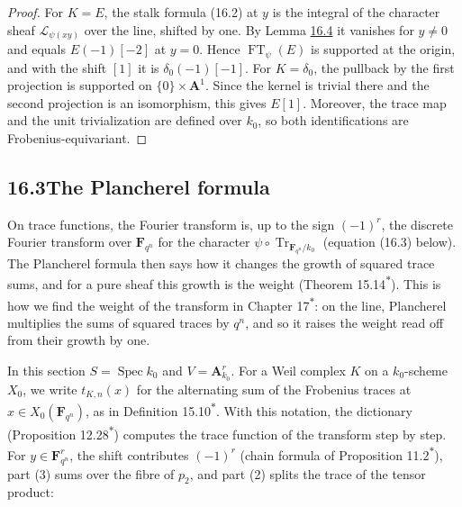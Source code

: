 \documentclass[11pt]{article}
\newcommand{\bpout}[1]{#1\textsuperscript{\hyperlink{bp-outside}{\ensuremath{\ast}}}}
\begin{document}
\begin{proof}[{Proof}]\label{bp23}%
For \(K=E\), the stalk formula (16.2) at \(y\) is the integral of the character sheaf \(\mathcal L_{\psi(xy)}\) over the line, shifted by one. By Lemma \hyperref[bp13]{16.4} it vanishes for \(y\ne0\) and equals \(E(-1)[-2]\) at \(y=0\). Hence \(\operatorname{FT}_\psi(E)\) is supported at the origin, and with the shift \([1]\) it is \(\delta_0(-1)[-1]\). For \(K=\delta_0\), the pullback by the first projection is supported on \(\{0\}\times\mathbf A^1\). Since the kernel is trivial there and the second projection is an isomorphism, this gives \(E[1]\). Moreover, the trace map and the unit trivialization are defined over \(k_0\), so both identifications are Frobenius-equivariant.
\end{proof}


\subsection*{\texorpdfstring{16.3\quad The Plancherel formula}{16.3 The Plancherel formula}}
\label{bp24}%
\label{bp25}%
On trace functions, the Fourier transform is, up to the sign \((-1)^r\), the discrete Fourier transform over \(\mathbf F_{q^n}\) for the character \(\psi\circ\operatorname{Tr}_{\mathbf F_{q^n}/k_0}\) (equation (16.3) below). The Plancherel formula then says how it changes the growth of squared trace sums, and for a pure sheaf this growth is the weight (Theorem \bpout{15.14}). This is how we find the weight of the transform in Chapter \bpout{17}: on the line, Plancherel multiplies the sums of squared traces by \(q^n\), and so it raises the weight read off from their growth by one.

In this section \(S=\operatorname{Spec}k_0\) and \(V=\mathbf A^r_{k_0}\). For a Weil complex \(K\) on a \(k_0\)-scheme \(X_0\), we write \(t_{K,n}(x)\) for the alternating sum of the Frobenius traces at \(x\in X_0(\mathbf F_{q^n})\), as in Definition \bpout{15.10}. With this notation, the dictionary (Proposition \bpout{12.28}) computes the trace function of the transform step by step. For \(y\in\mathbf F_{q^n}^r\), the shift contributes \((-1)^r\) (chain formula of Proposition \bpout{11.2}), part (3) sums over the fibre of \(p_2\), and part (2) splits the trace of the tensor product:
\end{document}
